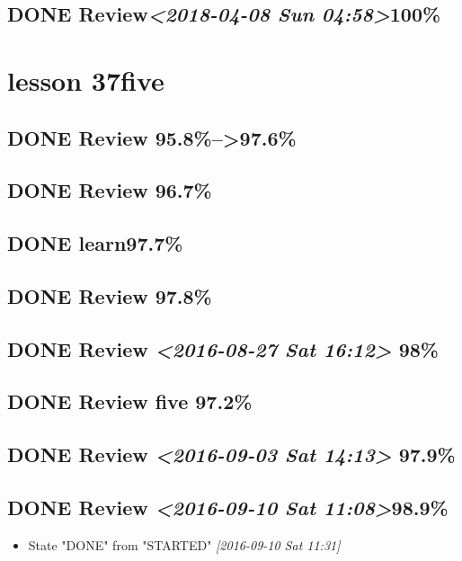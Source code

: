 \documentclass[11pt]{ctexart}
\begin{document}
\subsection{{\bfseries\sffamily DONE} Review\textit{<2018-04-08 Sun 04:58>}100\%}
\label{sec:org4d345f0}
\section{lesson 37five}
\label{sec:org67e7fa6}
\subsection{{\bfseries\sffamily DONE} Review 95.8\%-->97.6\%}
\label{sec:orgcae8e49}
\subsection{{\bfseries\sffamily DONE} Review 96.7\%}
\label{sec:org076fc39}
\subsection{{\bfseries\sffamily DONE} learn97.7\%}
\label{sec:org0bc497d}
\subsection{{\bfseries\sffamily DONE} Review 97.8\%}
\label{sec:org8a148f3}
\subsection{{\bfseries\sffamily DONE} Review \textit{<2016-08-27 Sat 16:12> } 98\%}
\label{sec:org43c63f0}
\subsection{{\bfseries\sffamily DONE} Review five 97.2\%}
\label{sec:org16f28c5}

\subsection{{\bfseries\sffamily DONE} Review \textit{<2016-09-03 Sat 14:13> } 97.9\%}
\label{sec:orgae03a2b}
\subsection{{\bfseries\sffamily DONE} Review \textit{<2016-09-10 Sat 11:08>}98.9\%}
\label{sec:orgeaf7b55}
\begin{itemize}
\item State "DONE"       from "STARTED"    \textit{[2016-09-10 Sat 11:31]}
\end{itemize}
\end{document}
